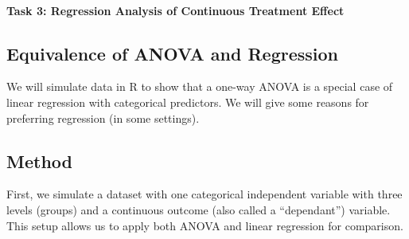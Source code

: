 \documentclass[
  singlecolumn]{article}
\let\oldparagraph\paragraph
\renewcommand{\paragraph}[1]{\oldparagraph{#1}\mbox{}}
\newenvironment{Shaded}{}{}
\newcommand{\AttributeTok}[1]{\textcolor[rgb]{0.84,0.23,0.29}{#1}}
\newcommand{\CommentTok}[1]{\textcolor[rgb]{0.42,0.45,0.49}{#1}}
\newcommand{\FunctionTok}[1]{\textcolor[rgb]{0.44,0.26,0.76}{#1}}
\newcommand{\NormalTok}[1]{\textcolor[rgb]{0.14,0.16,0.18}{#1}}
\newcommand{\OtherTok}[1]{\textcolor[rgb]{0.44,0.26,0.76}{#1}}
\newcommand{\SpecialCharTok}[1]{\textcolor[rgb]{0.00,0.36,0.77}{#1}}
\newcommand{\StringTok}[1]{\textcolor[rgb]{0.01,0.18,0.38}{#1}}
\theoremstyle{definition}
\theoremstyle{remark}
\begin{document}
\paragraph{\texorpdfstring{\textbf{Task 3: Regression Analysis of
Continuous Treatment
Effect}}{Task 3: Regression Analysis of Continuous Treatment Effect}}\label{task-3-regression-analysis-of-continuous-treatment-effect}

\begin{Shaded}
\end{Shaded}

\subsection{Equivalence of ANOVA and
Regression}\label{equivalence-of-anova-and-regression}

We will simulate data in R to show that a one-way ANOVA is a special
case of linear regression with categorical predictors. We will give some
reasons for preferring regression (in some settings).

\subsection{Method}\label{method}

First, we simulate a dataset with one categorical independent variable
with three levels (groups) and a continuous outcome (also called a
``dependant'') variable. This setup allows us to apply both ANOVA and
linear regression for comparison.
\end{document}
